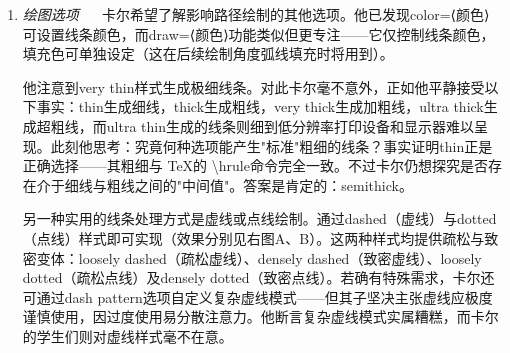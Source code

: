 \begin{enumerate}
    通过参数化机制，样式的功能变得更加强大。这意味着样式可以像其他选项一样接收参数。例如，卡尔可以将其网格样式参数化——默认显示为蓝色，同时保留切换其他颜色的灵活性：
    \begin{verbatim} 
    \begin{tikzpicture}
    [Karl's grid/.style ={help lines,color=#1!50},
    Karl's grid/.default=blue]

    \draw[Karl's grid]     (0,0) grid (1.5,2);
    \draw[Karl's grid=red] (2,0) grid (3.5,2);
    \end{tikzpicture}
    \end{verbatim}

    在此示例中，`Karl's grid`样式被定义为 \{tikzpicture\}环境的可选参数。如需为其他元素添加样式，只需以逗号分隔继续追加。当存在多个样式定义时，环境的可选参数长度很可能超过实际的绘图内容本身。

    \item \emph{绘图选项} ~~
    卡尔希望了解影响路径绘制的其他选项。他已发现color=⟨颜色⟩可设置线条颜色，而draw=⟨颜色⟩功能类似但更专注——它仅控制线条颜色，填充色可单独设定（这在后续绘制角度弧线填充时将用到）。

    他注意到very thin样式生成极细线条。对此卡尔毫不意外，正如他平静接受以下事实：thin生成细线，thick生成粗线，very thick生成加粗线，ultra thick生成超粗线，而ultra thin生成的线条则细到低分辨率打印设备和显示器难以呈现。此刻他思考：究竟何种选项能产生"标准"粗细的线条？事实证明thin正是正确选择——其粗细与 \TeX 的 \backslash hrule命令完全一致。不过卡尔仍想探究是否存在介于细线与粗线之间的"中间值"。答案是肯定的：semithick。

    另一种实用的线条处理方式是虚线或点线绘制。通过dashed（虚线）与dotted（点线）样式即可实现（效果分别见右图A、B）。这两种样式均提供疏松与致密变体：loosely dashed（疏松虚线）、densely dashed（致密虚线）、loosely dotted（疏松点线）及densely dotted（致密点线）。若确有特殊需求，卡尔还可通过dash pattern选项自定义复杂虚线模式——但其子坚决主张虚线应极度谨慎使用，因过度使用易分散注意力。他断言复杂虚线模式实属糟糕，而卡尔的学生们则对虚线样式毫不在意。


\end{enumerate}
